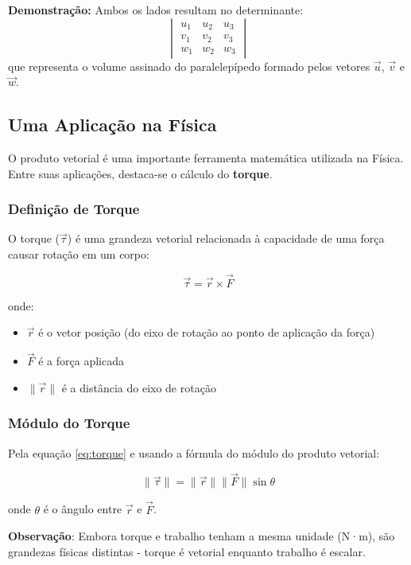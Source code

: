 \begin{enumerate}
\begin{itemize}
    \textbf{Demonstração:} Ambos os lados resultam no determinante:
    \[
    \begin{vmatrix}
    u_1 & u_2 & u_3 \\
    v_1 & v_2 & v_3 \\
    w_1 & w_2 & w_3
    \end{vmatrix}
    \]
    que representa o volume assinado do paralelepípedo formado pelos vetores
    $\vec{u}$, $\vec{v}$ e $\vec{w}$.
  \end{itemize}
\end{enumerate}

\newpage
\subsection{Uma Aplicação na Física}

O produto vetorial é uma importante ferramenta matemática utilizada na Física.
Entre suas aplicações, destaca-se o cálculo do \textbf{torque}.

\subsubsection*{Definição de Torque}
O torque ($\vec{\tau}$) é uma grandeza vetorial relacionada à capacidade de uma
força causar rotação em um corpo:

\begin{equation}
  \vec{\tau} = \vec{r} \times \vec{F}
  \label{eq:torque}
\end{equation}

onde:
\begin{itemize}
  \item $\vec{r}$ é o vetor posição (do eixo de rotação ao ponto de aplicação da
    força)
  \item $\vec{F}$ é a força aplicada
  \item $\|\vec{r}\|$ é a distância do eixo de rotação
\end{itemize}

\subsubsection*{Módulo do Torque}
Pela equação \eqref{eq:torque} e usando a fórmula do módulo do produto vetorial:

\begin{equation}
  \|\vec{\tau}\| = \|\vec{r}\|\|\vec{F}\|\sin\theta
  \label{eq:modulo_torque}
\end{equation}

onde $\theta$ é o ângulo entre $\vec{r}$ e $\vec{F}$.

\begin{center}
\begin{minipage}{0.9\textwidth}
  \textbf{Observação}: Embora torque e trabalho tenham a mesma unidade (N·m),
  são grandezas físicas distintas - torque é vetorial enquanto trabalho é
  escalar.
\end{minipage}
\end{center}
